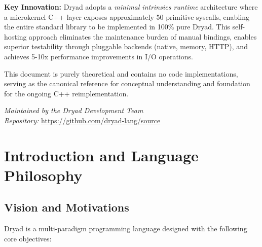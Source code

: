 \documentclass[12pt,a4paper]{article}
\theoremstyle{definition}
\begin{document}
\begin{titlepage}
\begin{center}
\begin{mdframed}[linecolor=dryadgreen, linewidth=2pt, roundcorner=5pt]
\textbf{Key Innovation:} Dryad adopts a \textit{minimal intrinsics runtime} architecture where a microkernel C++ layer exposes approximately 50 primitive syscalls, enabling the entire standard library to be implemented in 100\% pure Dryad. This self-hosting approach eliminates the maintenance burden of manual bindings, enables superior testability through pluggable backends (native, memory, HTTP), and achieves 5-10x performance improvements in I/O operations.

This document is purely theoretical and contains no code implementations, serving as the canonical reference for conceptual understanding and foundation for the ongoing C++ reimplementation.

\end{mdframed}

\vfill

\textit{Maintained by the Dryad Development Team}\\
\textit{Repository:} \url{https://github.com/dryad-lang/source}

\end{center}
\end{titlepage}

\tableofcontents
\newpage


\section{Introduction and Language Philosophy}

\subsection{Vision and Motivations}

Dryad is a multi-paradigm programming language designed with the following core objectives:
\end{document}
